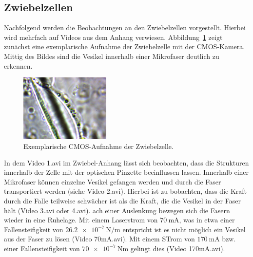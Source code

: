\subsection{Zwiebelzellen}
Nachfolgend werden die Beobachtungen an den Zwiebelzellen vorgestellt. Hierbei wird mehrfach auf Videos aus dem Anhang
verwiesen. Abbildung~\ref{fig: zwiebelzelle} zeigt zunächst eine exemplarische Aufnahme der Zwiebelzelle mit der CMOS-Kamera.
Mittig des Bildes sind die Vesikel innerhalb einer Mikrofaser deutlich zu erkennen.
\begin{figure}
  \centering
  \includegraphics[width = 0.4\textwidth]{../analysis/data/iii_zwiebel/bilder/1.png}
  \caption{Exemplarische CMOS-Aufnahme der Zwiebelzelle.}
  \label{fig: zwiebelzelle}
\end{figure}

In dem Video 1.avi im Zwiebel-Anhang lässt sich beobachten, dass die Strukturen innerhalb der Zelle mit der optischen Pinzette
beeinflussen lassen. Innerhalb einer Mikrofaser können einzelne Vesikel gefangen werden und durch die Faser transportiert werden
(siehe Video 2.avi). Hierbei ist zu bobachten, dass die Kraft durch die Falle teilweise schwächer ist als die Kraft, die die
Vesikel in der Faser hält (Video 3.avi oder 4.avi). ach einer Auslenkung bewegen sich die Fasern wieder in eine
Ruhelage. Mit einem Laserstrom von $\SI{70}{\milli\ampere}$, was in etwa einer Fallensteifigkeit von
$\SI{26.2e-7}{\newton\per\meter}$ entspricht ist es nicht möglich ein Vesikel aus der Faser zu lösen (Video 70mA.avi). Mit einem STrom
von $\SI{170}{\milli\ampere}$ bzw. einer Fallensteifigkeit von $\SI{70e-7}{\newton\meter}$ gelingt dies (Video 170mA.avi).  

